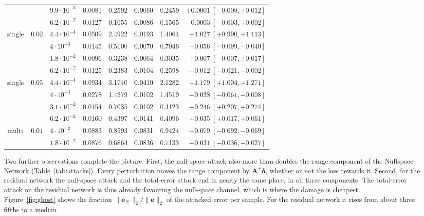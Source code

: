 \documentclass{article}
\numberwithin{equation}{section}
\begin{document}
\begin{table}[htbp]
\begin{tabular}{l l l rr rr r}
       &         & $9.9\cdot10^{-3}$ & 0.0081 & 0.2592 & 0.0060 & 0.2459 & $+0.0001\;[-0.008,+0.012]$ \\
       &         & $6.2\cdot10^{-2}$ & 0.0127 & 0.1655 & 0.0086 & 0.1565 & $-0.0003\;[-0.003,+0.002]$ \\
\midrule
single & $0.02$  & $4.4\cdot10^{-4}$ & 0.0509 & 2.4922 & 0.0193 & 1.4064 & $+1.027\;[+0.990,+1.113]$ \\
       &         & $4\cdot10^{-3}$   & 0.0145 & 0.5100 & 0.0070 & 0.7046 & $-0.056\;[-0.099,-0.040]$ \\
       &         & $1.8\cdot10^{-2}$ & 0.0096 & 0.3238 & 0.0064 & 0.3035 & $+0.007\;[-0.007,+0.017]$ \\
       &         & $6.2\cdot10^{-2}$ & 0.0125 & 0.2383 & 0.0104 & 0.2598 & $-0.012\;[-0.021,-0.002]$ \\
\midrule
single & $0.05$  & $4.4\cdot10^{-4}$ & 0.0934 & 3.1740 & 0.0410 & 2.1282 & $+1.179\;[+1.004,+1.271]$ \\
       &         & $4\cdot10^{-3}$   & 0.0278 & 1.4279 & 0.0102 & 1.4519 & $-0.028\;[-0.061,-0.008]$ \\
       &         & $3.1\cdot10^{-2}$ & 0.0154 & 0.7035 & 0.0102 & 0.4123 & $+0.246\;[+0.207,+0.274]$ \\
       &         & $6.2\cdot10^{-2}$ & 0.0160 & 0.4397 & 0.0141 & 0.4096 & $+0.035\;[+0.017,+0.061]$ \\
\midrule
multi  & $0.01$  & $4\cdot10^{-3}$   & 0.0883 & 0.8593 & 0.0831 & 0.9424 & $-0.079\;[-0.092,-0.069]$ \\
       &         & $1.8\cdot10^{-2}$ & 0.0876 & 0.6864 & 0.0836 & 0.7133 & $-0.031\;[-0.036,-0.027]$ \\
\bottomrule
\end{tabular}
\end{table}
Two further observations complete the picture. First, the null-space attack also more than doubles
the range component of the Nullspace Network (Table~\ref{tab:attacks}). Every perturbation moves the
range component by $\mathbf{A}^{+}\boldsymbol{\delta}$, whether or not the loss rewards it.
Second, for the residual network the null-space attack and the total-error
attack end in nearly the same place, in all three components.
The total-error attack on the residual network is thus already favouring the null-space channel,
which is where the damage is cheapest.\\
Figure~\ref{fig:ghost} shows the fraction $\lVert\mathbf{e}_\mathcal{N}\rVert_2/\lVert\mathbf{e}\rVert_2$
of the attacked error per sample. For the residual network it rises from about three fifths to a median
\end{document}
